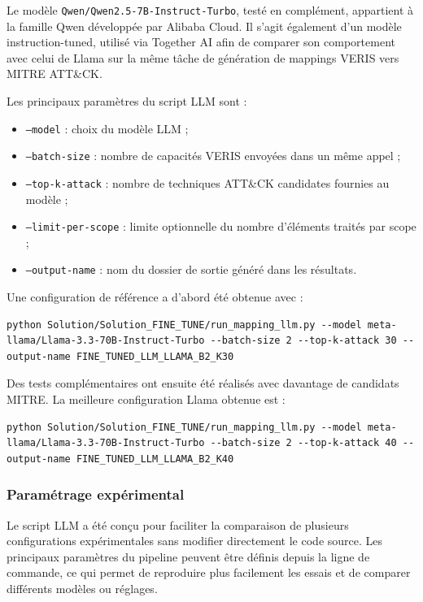 \documentclass[a4paper,12pt]{article}
\begin{document}
Le modèle \texttt{Qwen/Qwen2.5-7B-Instruct-Turbo}, testé en complément, appartient à la famille Qwen développée par Alibaba Cloud. Il s'agit également d'un modèle instruction-tuned, utilisé via Together AI afin de comparer son comportement avec celui de Llama sur la même tâche de génération de mappings VERIS vers MITRE ATT\&CK.

Les principaux paramètres du script LLM sont :

\begin{itemize}
    \item \texttt{--model} : choix du modèle LLM ;
    \item \texttt{--batch-size} : nombre de capacités VERIS envoyées dans un même appel ;
    \item \texttt{--top-k-attack} : nombre de techniques ATT\&CK candidates fournies au modèle ;
    \item \texttt{--limit-per-scope} : limite optionnelle du nombre d'éléments traités par scope ;
    \item \texttt{--output-name} : nom du dossier de sortie généré dans les résultats.
\end{itemize}

Une configuration de référence a d'abord été obtenue avec :

\begin{verbatim}
python Solution/Solution_FINE_TUNE/run_mapping_llm.py --model meta-llama/Llama-3.3-70B-Instruct-Turbo --batch-size 2 --top-k-attack 30 --output-name FINE_TUNED_LLM_LLAMA_B2_K30
\end{verbatim}

Des tests complémentaires ont ensuite été réalisés avec davantage de candidats MITRE. La meilleure configuration Llama obtenue est :

\begin{verbatim}
python Solution/Solution_FINE_TUNE/run_mapping_llm.py --model meta-llama/Llama-3.3-70B-Instruct-Turbo --batch-size 2 --top-k-attack 40 --output-name FINE_TUNED_LLM_LLAMA_B2_K40
\end{verbatim}

\subsubsection{Paramétrage expérimental}

Le script LLM a été conçu pour faciliter la comparaison de plusieurs configurations expérimentales sans modifier directement le code source. Les principaux paramètres du pipeline peuvent être définis depuis la ligne de commande, ce qui permet de reproduire plus facilement les essais et de comparer différents modèles ou réglages.
\end{document}
